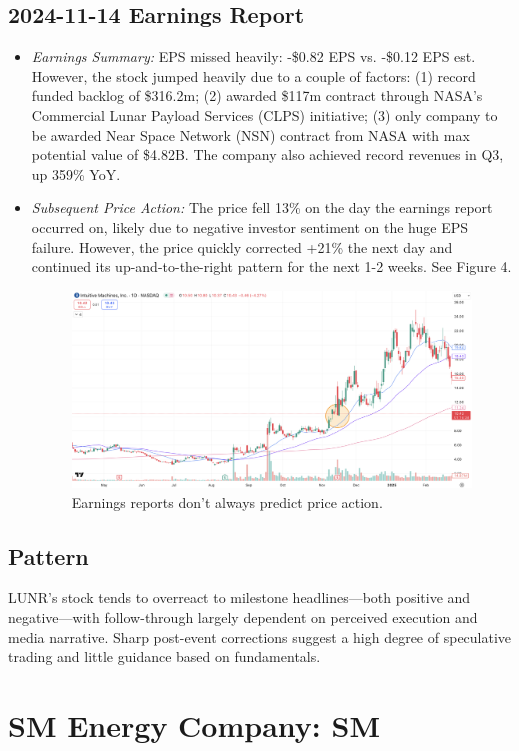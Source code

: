 \documentclass[11pt]{article}
\begin{document}
    \subsection{2024-11-14 Earnings Report}
        \begin{itemize}
            \item \textit{Earnings Summary:} EPS missed heavily: -\$0.82 EPS vs. -\$0.12 EPS est. However, the stock jumped heavily due to a couple of factors: (1) record funded backlog of \$316.2m; (2) awarded \$117m contract through NASA's Commercial Lunar Payload Services (CLPS) initiative; (3) only company to be awarded Near Space Network (NSN) contract from NASA with max potential value of \$4.82B. The company also achieved record revenues in Q3, up 359\% YoY.
            \item \textit{Subsequent Price Action:} The price fell 13\% on the day the earnings report occurred on, likely due to negative investor sentiment on the huge EPS failure. However, the price quickly corrected +21\% the next day and continued its up-and-to-the-right pattern for the next 1-2 weeks. See Figure 4.
            \begin{figure}[h]
                \centering \includegraphics[width=0.8\linewidth]{images/LUNR2.png}
                \caption{Earnings reports don't always predict price action.}
            \end{figure}
        \end{itemize}
        \subsection{Pattern}
        LUNR’s stock tends to overreact to milestone headlines—both positive and negative—with follow-through largely dependent on perceived execution and media narrative. Sharp post-event corrections suggest a high degree of speculative trading and little guidance based on fundamentals.
\section{SM Energy Company: SM}
\end{document}

